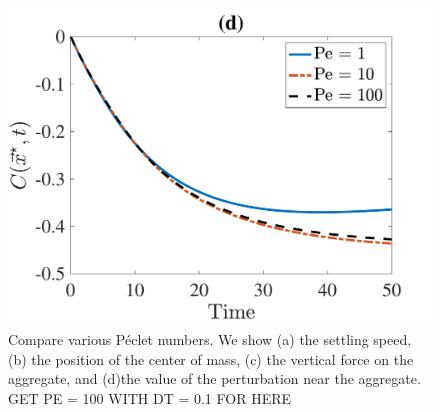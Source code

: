 \begin{figure}[ht]
\begin{center}
		\includegraphics[scale=0.35]{./figures/fig_NC50_Pe_C_star}
	\caption{Compare various Péclet numbers. We show (a) the settling speed, (b) the position of the center of mass, (c) the vertical force on the aggregate, and (d)the value of the perturbation near the aggregate. GET PE = 100 WITH DT = 0.1 FOR HERE}
	\label{fig_NC50_Pe}
\end{center}
\end{figure}
